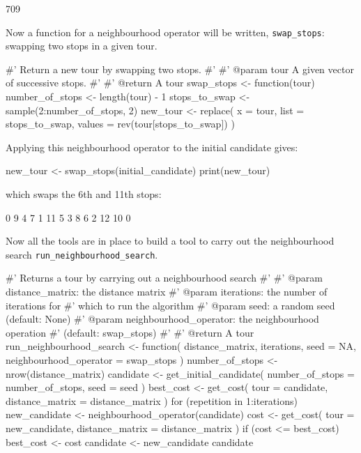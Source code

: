 \begin{Rout}
[1] 709
\end{Rout}

Now a function for a neighbourhood operator will be written,
\texttt{swap_stops}: swapping two stops in a given tour.

\begin{Rin}
#' Return a new tour by swapping two stops.
#'
#' @param tour A given vector of successive stops.
#'
#' @return A tour
swap_stops <- function(tour){
  number_of_stops <- length(tour) - 1
  stops_to_swap <- sample(2:number_of_stops, 2)
  new_tour <- replace(
    x = tour,
    list = stops_to_swap,
    values = rev(tour[stops_to_swap])
  )
}
\end{Rin}

Applying this neighbourhood operator to the initial candidate gives:

\begin{Rin}
new_tour <- swap_stops(initial_candidate)
print(new_tour)
\end{Rin}

which swaps the 6th and 11th stops:

\begin{Rout}
 [1]  0  9  4  7  1 11  5  3  8  6  2 12 10  0
\end{Rout}

Now all the tools are in place to build a tool to carry out the
neighbourhood search \texttt{run_neighbourhood_search}.

\begin{Rin}
#' Returns a tour by carrying out a neighbourhood search
#'
#' @param distance_matrix: the distance matrix
#' @param iterations: the number of iterations for
#'                    which to run the algorithm
#' @param seed: a random seed (default: None)
#' @param neighbourhood_operator: the neighbourhood operation
#'                                (default: swap_stops)
#'
#' @return A tour
run_neighbourhood_search <- function(
  distance_matrix,
  iterations,
  seed = NA,
  neighbourhood_operator = swap_stops
){
  number_of_stops <- nrow(distance_matrix)
  candidate <- get_initial_candidate(
    number_of_stops = number_of_stops,
    seed = seed
  )
  best_cost <- get_cost(
    tour = candidate,
    distance_matrix = distance_matrix
  )
  for (repetition in 1:iterations) {
    new_candidate <- neighbourhood_operator(candidate)
    cost <- get_cost(
        tour = new_candidate,
        distance_matrix = distance_matrix
    )
    if (cost <= best_cost) {
      best_cost <- cost
      candidate <- new_candidate
    }
  }
  candidate
}
\end{Rin}

